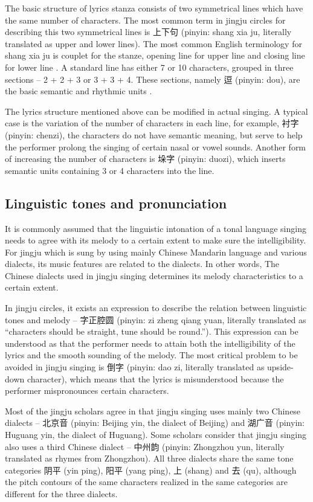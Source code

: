 The basic structure of lyrics stanza consists of two symmetrical lines which have the same number of characters. The most common term in jingju circles for describing this two symmetrical lines is 上下句 (pinyin: shang xia ju, literally translated as upper and lower lines). The most common English terminology for shang xia ju is couplet for the stanze, opening line for upper line and closing line for lower line \cite{Repetto2018}. A standard line has either 7 or 10 characters, grouped in three sections -- 2 + 2 + 3 or 3 + 3 + 4. These sections, namely 逗 (pinyin: dou), are the basic semantic and rhythmic units \cite{Wichmann1991a}.

The lyrics structure mentioned above can be modified in actual singing. A typical case is the variation of the number of characters in each line, for example, 衬字 (pinyin: chenzi), the characters do not have semantic meaning, but serve to help the performer prolong the singing of certain nasal or vowel sounds. Another form of increasing the number of characters is 垛字 (pinyin: duozi), which inserts semantic units containing 3 or 4 characters into the line.

\subsection{Linguistic tones and pronunciation}\label{sec:linguistic_tones}

It is commonly assumed that the linguistic intonation of a tonal language singing needs to agree with its melody to a certain extent to make sure the intelligibility. For jingju which is sung by using mainly Chinese Mandarin language and various dialects, its music features are related to the dialects. In other words, The Chinese dialects used in jingju singing determines its melody characteristics to a certain extent.

In jingju circles, it exists an expression to describe the relation between linguistic tones and melody -- 字正腔圆 (pinyin: zi zheng qiang yuan, literally translated as “characters should be straight, tune should be round.”). This expression can be understood as that the performer needs to attain both the intelligibility of the lyrics and the smooth sounding of the melody. The most critical problem to be avoided in jingju singing is 倒字 (pinyin: dao zi, literally translated as upside-down character), which means that the lyrics is misunderstood because the performer mispronounces certain characters.

Most of the jingju scholars agree in that jingju singing uses mainly two Chinese dialects -- 北京音 (pinyin: Beijing yin, the dialect of Beijing) and 湖广音 (pinyin: Huguang yin, the dialect of Huguang). Some scholars consider that jingju singing also uses a third Chinese dialect -- 中州韵 (pinyin: Zhongzhou yun, literally translated as rhymes from Zhongzhou). All three dialects share the same tone categories 阴平 (yin ping), 阳平 (yang ping), 上 (shang) and 去 (qu), although the pitch contours of the same characters realized in the same categories are different for the three dialects.

